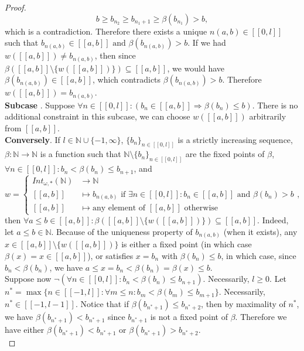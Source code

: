 \documentclass[10pt,a4paper]{amsart}
\newcommand*\circled[1]{\tikz[baseline=(char.base)]{
            \node[shape=circle,draw,inner sep=2pt] (char) {#1};}}
\begin{document}
\begin{proof}
\[ b \geq b_{n_2} \geq b_{n_1 + 1} \geq \beta(b_{n_1}) > b, \]
which is a contradiction. Therefore there exists a unique $n(a,b) \in [\![0,l]\!]$ such that $b_{n(a,b)} \in [\![a,b]\!] \text{ and } \beta(b_{n(a,b)}) > b$. If we had $w([\![a,b]\!]) \neq b_{n(a,b)}$, then since $\beta([\![a,b]\!]\setminus \{w([\![a,b]\!])\}) \subseteq [\![a,b]\!]$, we would have $\beta(b_{n(a,b)}) \in [\![a,b]\!]$, which contradicts $\beta(b_{n(a,b)}) > b$. Therefore $w([\![a,b]\!]) = b_{n(a,b)}$. \\
\textbf{Subcase \circled{1.2}}. Suppose $\forall n \in [\![0,l]\!] : (b_n \in [\![a,b]\!] \Rightarrow \beta(b_n) \leq b)$. There is no additional constraint in this subcase, we can choose $w([\![a,b]\!])$ arbitrarily from $[\![a,b]\!]$. \\
\textbf{Conversely}. If $l \in \mathbb{N} \cup \{-1, \infty\}$, $\{b_n\}_{n \in [\![0,l]\!]}$ is a strictly increasing sequence, $\beta : \mathbb{N} \to \mathbb{N}$ is a function such that $\mathbb{N} \setminus \{b_n\}_{n \in [\![0,l]\!]}$ are the fixed points of $\beta$, $\forall n \in [\![0,l]\!] : b_n < \beta(b_n) \leq b_{n+1}$, and 
\[ w = \begin{cases} Int_{\omega,*}(\mathbb{N}) &\to \mathbb{N} \\ [\![a,b]\!] &\mapsto b_{n(a,b)} \text { if } \exists n \in [\![0,l]\!] : b_n \in [\![a,b]\!] \text{ and } \beta(b_n) > b \\ [\![a,b]\!] &\mapsto \text{any element of } [\![a,b]\!] \text{ otherwise} \end{cases}, \]
then $\forall a \leq b \in [\![a,b]\!] : \beta([\![a,b]\!] \setminus \{w([\![a,b]\!])\}) \subseteq [\![a,b]\!]$. Indeed, let $a \leq b \in \mathbb{N}$. Because of the uniqueness property of $b_{n(a,b)}$ (when it exists), any $x \in [\![a,b]\!] \setminus \{w([\![a,b]\!])\}$ is either a fixed point (in which case $\beta(x) = x \in [\![a,b]\!]$), or satisfies $x = b_n$ with $\beta(b_n) \leq b$, in which case, since $b_n < \beta(b_n)$, we have $a \leq x =  b_n < \beta(b_n) = \beta(x) \leq b$. \\

\noindent Suppose now $\neg \left( \forall n \in [\![0,l]\!] : b_n < \beta(b_n) \leq b_{n+1} \right)$. Necessarily, $l \geq 0$. Let $n^* = \max \{ n \in [\![-1,l]\!] : \forall m \leq n : b_m < \beta(b_m) \leq b_{m+1} \}$. Necessarily, $n^* \in [\![-1,l-1]\!]$. Notice that if $\beta(b_{n^* +1}) \leq b_{n^*+2}$, then by maximality of $n^*$, we have $\beta(b_{n^*+1}) < b_{n^*+1}$ since $b_{n^*+1}$ is not a fixed point of $\beta$. Therefore we have either $\beta(b_{n^*+1}) < b_{n^*+1}$ or $\beta(b_{n^*+1}) > b_{n^*+2}$. \\


\end{proof}
\end{document}
